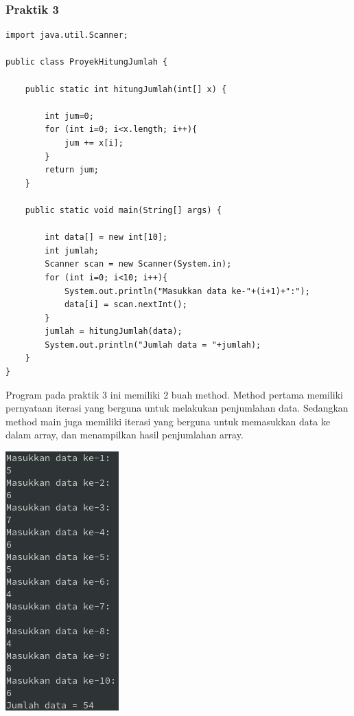 \documentclass[a4paper,12pt]{article}
\begin{document}
\subsubsection{Praktik 3}
\begin{lstlisting}
import java.util.Scanner;

public class ProyekHitungJumlah {

    public static int hitungJumlah(int[] x) {
        
        int jum=0;
        for (int i=0; i<x.length; i++){
            jum += x[i];
        }
        return jum;
    }

    public static void main(String[] args) {

        int data[] = new int[10];
        int jumlah;
        Scanner scan = new Scanner(System.in);
        for (int i=0; i<10; i++){
            System.out.println("Masukkan data ke-"+(i+1)+":");
            data[i] = scan.nextInt();
        }
        jumlah = hitungJumlah(data);
        System.out.println("Jumlah data = "+jumlah);
    }
}
\end{lstlisting}
Program pada praktik 3 ini memiliki 2 buah method. Method pertama memiliki pernyataan iterasi yang berguna untuk
melakukan penjumlahan data. Sedangkan method main juga memiliki iterasi yang berguna untuk memasukkan data ke dalam
array, dan menampilkan hasil penjumlahan array.

\begin{center}
    \includegraphics[scale=1]{3.png} 
\end{center}
\end{document}
